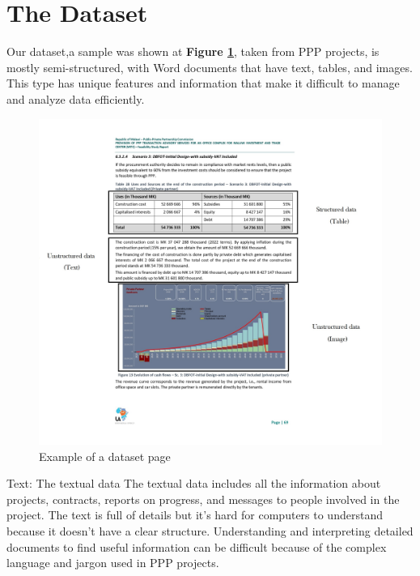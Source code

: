 \section{The Dataset}
Our dataset,a sample was shown at \textbf{Figure \ref{fig:dataset}}, taken from PPP projects, is mostly semi-structured, with Word documents that have text, tables, and images. This type has unique features and information that make it difficult to manage and analyze data efficiently.
\vskip 0.5cm
\begin{figure}[H]
    
    \centering
    \includegraphics[width=1 \linewidth]{assets/data_ex_page-0001.jpg}
    \caption{Example of a dataset page}
    \label{fig:dataset}
\end{figure}
\vskip 0.5cm
Text: The textual data The textual data includes all the information about projects, contracts, reports on progress, and messages to people involved in the project. The text is full of details but it's hard for computers to understand because it doesn't have a clear structure. Understanding and interpreting detailed documents to find useful information can be difficult because of the complex language and jargon used in PPP projects.
